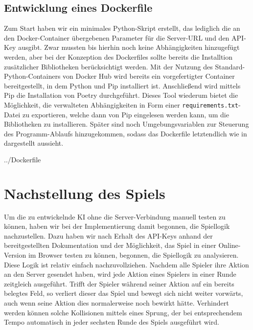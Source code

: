\subsection{Entwicklung eines Dockerfile}
\label{subsec:dockerfile}

Zum Start haben wir ein minimales Python-Skript erstellt, das lediglich die
an den Docker-Container übergebenen Parameter für die Server-URL und den API-Key ausgibt.
Zwar mussten bis hierhin noch keine Abhängigkeiten hinzugefügt werden, aber bei der Konzeption des Dockerfiles sollte
bereits die Installtion zusätzlicher Bibliotheken berücksichtigt werden.
Mit der Nutzung des Standard-Python-Containers von Docker Hub wird bereits ein vorgefertigter Container bereitgestellt,
in dem Python und Pip installiert ist.
Anschließend wird mittels Pip die Installation von Poetry durchgeführt.
Dieses Tool wiederum bietet die Möglichkeit, die verwalteten Abhängigkeiten in Form einer
\texttt{requirements.txt}-Datei zu exportieren, welche dann von Pip eingelesen werden kann, um die Bibliotheken zu
installieren.
Später sind noch Umgebungsvariablen zur Steuerung des Programm-Ablaufs hinzugekommen, sodass das Dockerfile
letztendlich wie in  dargestellt aussieht.


{../Dockerfile}

\section{Nachstellung des Spiels}
\label{sec:nachstellung-spiel}

Um die zu entwickelnde \ac{KI} ohne die Server-Verbindung manuell testen zu können, haben wir bei der Implementierung
damit begonnen, die Spiellogik nachzustellen.
Dazu haben wir nach Erhalt des API-Keys anhand der bereitgestellten Dokumentation und der Möglichkeit, das Spiel in
einer Online-Version im Browser testen zu können, begonnen, die Spiellogik zu analysieren. \\

Diese Logik ist relativ einfach nachzuvollziehen.
Nachdem alle Spieler ihre Aktion an den Server gesendet haben, wird jede Aktion eines Spielers in einer Runde zeitgleich
ausgeführt.
Trifft der Spieler während seiner Aktion auf ein bereits belegtes Feld, so verliert dieser das Spiel und bewegt sich
nicht weiter vorwärts, auch wenn seine Aktion dies normalerweise noch bewirkt hätte.
Verhindert werden können solche Kollisionen mittels eines Sprung, der bei entsprechendem Tempo automatisch in jeder
sechsten Runde des Spiels ausgeführt wird. \\

